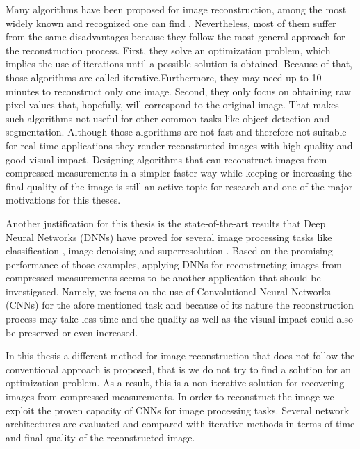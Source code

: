 Many algorithms have been proposed for image reconstruction, among the most widely known and recognized one can find \cite{metzler2014denoising,dong2014compressive, li2013efficient,mun2009block,chen2011compressed,fowler2011multiscale}. Nevertheless, most of them suffer from the same disadvantages because they follow the most general approach for the reconstruction process. First, they solve an optimization problem, which implies the use of iterations until a possible solution is obtained. Because of that, those algorithms are called iterative.Furthermore, they may need up to 10 minutes to reconstruct only one image. Second, they only focus on obtaining raw pixel values that, hopefully, will correspond to the original image. That makes such algorithms not useful for other common tasks like object detection and segmentation. Although those algorithms are not fast and therefore not suitable for real-time applications they render reconstructed images with high quality and good visual impact. Designing algorithms that can reconstruct images from compressed measurements in a simpler faster way while keeping or increasing the final quality of the image is still an active topic for research and one of the major motivations for this theses. \

Another justification for this thesis is the state-of-the-art results that Deep Neural Networks (DNNs) \cite{lecun2015deep} have proved for several image processing tasks like classification \cite{krizhevsky2012imagenet}, image denoising \cite{burger2012image} and superresolution \cite{dong2014learning}. Based on the promising performance of those examples, applying DNNs for reconstructing images from compressed measurements seems to be another application that should be investigated. Namely, we focus on the use of Convolutional Neural Networks (CNNs) for the afore mentioned task and because of its nature the reconstruction process may take less time and the quality as well as the visual impact could also be preserved or even increased.  

In this thesis a different method for image reconstruction that does not follow the conventional approach is proposed, that is we do not try to find a solution for an optimization problem. As a result, this is a non-iterative solution for recovering images from compressed measurements. In order to reconstruct the image we exploit the proven capacity of CNNs for image processing tasks. Several network architectures are evaluated and compared with iterative methods in terms of time and final quality of the reconstructed image.

